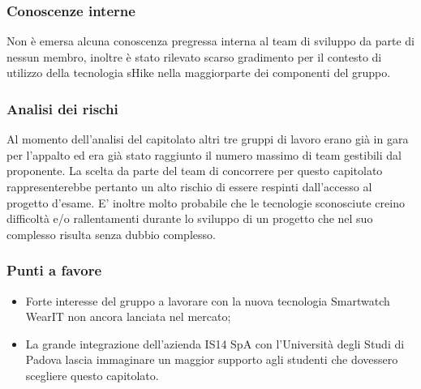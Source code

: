  \subsubsection{Conoscenze interne}
  Non è emersa alcuna conoscenza pregressa interna al team di sviluppo da parte di nessun membro, inoltre è stato rilevato scarso gradimento per il contesto di utilizzo della tecnologia sHike nella maggiorparte dei componenti del gruppo.
  \subsubsection{Analisi dei rischi}
  Al momento dell'analisi del capitolato altri tre gruppi di lavoro erano già in gara per l'appalto ed era già stato raggiunto il numero massimo di team gestibili dal proponente. La scelta da parte del team di concorrere per questo capitolato rappresenterebbe pertanto un alto rischio di essere respinti dall'accesso al progetto d'esame. E' inoltre molto probabile che le tecnologie sconosciute creino difficoltà e/o rallentamenti durante lo sviluppo di un progetto che nel suo complesso risulta senza dubbio complesso.
  \subsubsection{Punti a favore}
  \begin{itemize}
     \item Forte interesse del gruppo a lavorare con la nuova tecnologia Smartwatch WearIT non ancora lanciata nel mercato;
     \item La grande integrazione dell'azienda IS14 SpA con l'Università degli Studi di Padova lascia immaginare un maggior supporto agli studenti che dovessero scegliere questo capitolato.
  \end{itemize}